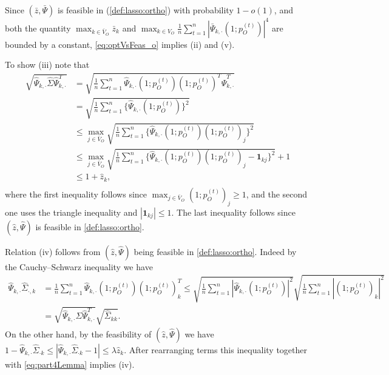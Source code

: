 \documentclass[opre,nonblindrev]{informs3} %
\def\Phk{\hat{\Psi}_{k,\cdot} }
\begin{document}
\begin{APPENDIX}{}
Since $(\bar{z},\bar \Psi)$ is feasible
in 	(\ref{def:lasso:ortho})
with probability $1-o(1)$, and both
the quantity $\max_{k\in \bar V_O} \bar z_k$ and $\max_{k\in V_O}\frac{1}{n}\sum_{t=1}^n|\bar\Psi_{k,\cdot}(1;p_O^{(t)})|^4$  are bounded by a constant, 
\eqref{eq:optVsFeas_o} implies (ii) and (v).



To show (iii) note that
$$\begin{array}{rl}
\sqrt{ \Phk \hat\Sigma  \Phk^T} & = \sqrt{\frac{1}{n}\sum_{t=1}^n \Phk  (1;p_O^{(t)}) (1;p_O^{(t)})^T \Phk^T } \\
& = \sqrt{\frac{1}{n}\sum_{t=1}^n \{\Phk (1;p_O^{(t)})\}^2}\\
& \leq \max_{j\in \bar V_O} \sqrt{\frac{1}{n}\sum_{t=1}^n \{\Phk (1;p_O^{(t)})(1;p_O^{(t)})_j\}^2}\\
& \leq \max_{j\in \bar V_O} \sqrt{\frac{1}{n}\sum_{t=1}^n \{\Phk (1;p_O^{(t)})(1;p_O^{(t)})_j-\mathbf{1}_{kj}\}^2}+1\\
& \leq 1 + \hat z_k, \\
\end{array}$$
where the first inequality follows since $\max_{j\in \bar V_O} (1;p_O^{(t)})_j \geq 1$, and the second one uses the triangle inequality and $|\mathbf{1}_{kj}|\leq 1$.
The last inequality follows since $(\hat{z},\hat \Psi)$ is feasible in \eqref{def:lasso:ortho}.


Relation (iv) follows from $(\hat{z},\hat \Psi)$ being feasible in \eqref{def:lasso:ortho}. Indeed by the Cauchy--Schwarz inequality we have
\begin{equation}\label{eq:part4Lemma}
\begin{aligned}
 \Phk \hat\Sigma_{\cdot, k} &= \frac{1}{n}\sum_{t=1}^n \Phk (1;p_O^{(t)})(1;p_O^{(t)})^T_k\leq \sqrt{\frac{1}{n}\sum_{t=1}^n|\Phk(1;p_O^{(t)})|^2}\sqrt{\frac{1}{n}\sum_{t=1}^n |(1;p^{(t)}_O)_k|^2}\\
 &= \sqrt{ \Phk \hat\Sigma  \Phk^T} \sqrt{\hat\Sigma_{kk}}.
 \end{aligned}
\end{equation}
On the other hand, by the feasibility of
$(\hat{z},\hat \Psi)$
we have 
$
1- \Phk \hat\Sigma_{\cdot k}\leq 
| \Phk \hat\Sigma_{\cdot k}- 1| \leq \lambda\hat z_k$.
After rearranging terms this inequality together with
\eqref{eq:part4Lemma} implies   (iv).
\hfill \halmos
\endproof





\end{APPENDIX}
\end{document}
